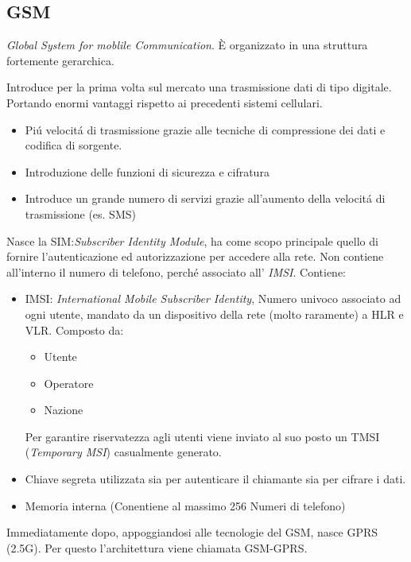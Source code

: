 \documentclass{article}
\begin{document}
\subsection{GSM}
\textit{Global System for moblile Communication}. \`E organizzato in una struttura fortemente gerarchica.

Introduce per la prima volta sul mercato una trasmissione dati di tipo digitale. Portando enormi vantaggi rispetto ai precedenti sistemi cellulari.
\begin{itemize}
    \item Pi\'u velocit\'a di trasmissione  grazie alle tecniche di compressione dei dati e codifica di sorgente.
    \item Introduzione delle funzioni di sicurezza e cifratura
    \item Introduce un grande numero di servizi grazie all'aumento della velocit\'a di trasmissione (es. SMS)
\end{itemize}

Nasce la SIM:\@\textit{Subscriber Identity Module}, ha come scopo principale quello di fornire l'autenticazione ed autorizzazione per accedere alla rete. Non contiene all'interno il numero di telefono, perch\'e associato all' \textit{IMSI}. Contiene:

\begin{itemize}
    \item IMSI: \textit{International Mobile Subscriber Identity}, Numero univoco associato ad ogni utente, mandato da un dispositivo della rete (molto raramente) a HLR e VLR. Composto da:
        \begin{itemize}
            \item Utente
            \item Operatore
            \item Nazione
        \end{itemize}
        Per garantire riservatezza agli utenti viene inviato al suo posto un TMSI (\textit{Temporary MSI}) casualmente generato.
    \item Chiave segreta utilizzata sia per autenticare il chiamante sia per cifrare i dati.
    \item Memoria interna (Conentiene al massimo 256 Numeri di telefono)
\end{itemize}

Immediatamente dopo, appoggiandosi alle tecnologie del GSM, nasce GPRS (2.5G). Per questo l'architettura viene chiamata GSM-GPRS.
\end{document}
